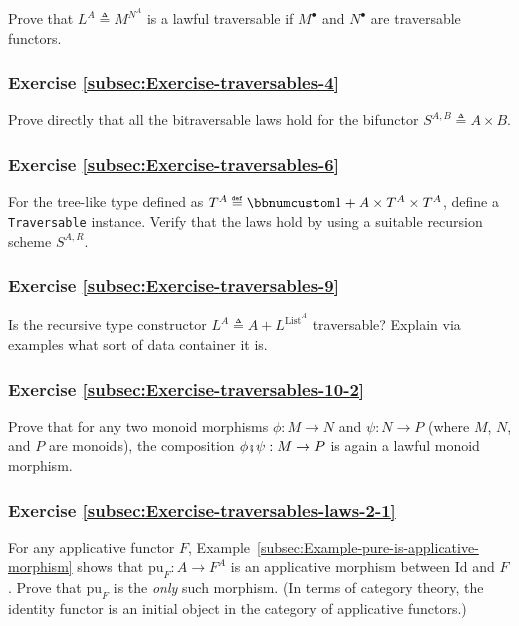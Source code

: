 Prove that $L^{A}\triangleq M^{N^{A}}$ is a lawful traversable if
$M^{\bullet}$ and $N^{\bullet}$ are traversable functors.

\subsubsection{Exercise \label{subsec:Exercise-traversables-4}\ref{subsec:Exercise-traversables-4}}

Prove directly that all the bitraversable laws hold for the bifunctor
$S^{A,B}\triangleq A\times B$.

\subsubsection{Exercise \label{subsec:Exercise-traversables-6}\ref{subsec:Exercise-traversables-6}}

For the tree-like type defined as $T^{A}\triangleq\bbnum 1+A\times T^{A}\times T^{A}$,
define a \lstinline!Traversable! instance. Verify that the laws hold
by using a suitable recursion scheme $S^{A,R}$.

\subsubsection{Exercise \label{subsec:Exercise-traversables-9}\ref{subsec:Exercise-traversables-9}}

Is the recursive type constructor $L^{A}\triangleq A+L^{\text{List}^{A}}$
traversable? Explain via examples what sort of data container it is.

\subsubsection{Exercise \label{subsec:Exercise-traversables-10-2}\ref{subsec:Exercise-traversables-10-2}}

Prove that for any two monoid morphisms $\phi:M\rightarrow N$ and
$\psi:N\rightarrow P$ (where $M$, $N$, and $P$ are monoids), the
composition $\phi\bef\psi:M\rightarrow P$ is again a lawful monoid
morphism.

\subsubsection{Exercise \label{subsec:Exercise-traversables-laws-2-1}\ref{subsec:Exercise-traversables-laws-2-1}}

For any applicative functor $F$, Example~\ref{subsec:Example-pure-is-applicative-morphism}
shows that $\text{pu}_{F}:A\rightarrow F^{A}$ is an applicative morphism
between $\text{Id}$ and $F$. Prove that $\text{pu}_{F}$ is the
\emph{only} such morphism. (In terms of category theory, the identity
functor is an initial object in the category of applicative functors.)

